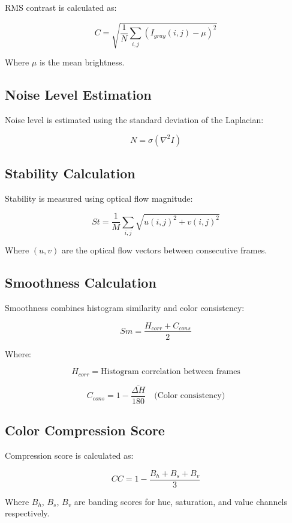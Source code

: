 \documentclass[
  11pt,
]{article}
\begin{document}
RMS contrast is calculated as:

\[C = \sqrt{\frac{1}{N} \sum_{i,j} (I_{gray}(i,j) - \mu)^2}\]

Where \(\mu\) is the mean brightness.

\hypertarget{noise-level-estimation}{%
\subsection{Noise Level Estimation}\label{noise-level-estimation}}

Noise level is estimated using the standard deviation of the Laplacian:

\[N = \sigma(\nabla^2 I)\]

\hypertarget{stability-calculation}{%
\subsection{Stability Calculation}\label{stability-calculation}}

Stability is measured using optical flow magnitude:

\[St = \frac{1}{M} \sum_{i,j} \sqrt{u(i,j)^2 + v(i,j)^2}\]

Where \((u, v)\) are the optical flow vectors between consecutive
frames.

\hypertarget{smoothness-calculation}{%
\subsection{Smoothness Calculation}\label{smoothness-calculation}}

Smoothness combines histogram similarity and color consistency:

\[Sm = \frac{H_{corr} + C_{cons}}{2}\]

Where:

\[H_{corr} = \text{Histogram correlation between frames}\]

\[C_{cons} = 1 - \frac{\bar{\Delta H}}{180} \quad \text{(Color consistency)}\]

\hypertarget{color-compression-score}{%
\subsection{Color Compression Score}\label{color-compression-score}}

Compression score is calculated as:

\[CC = 1 - \frac{B_h + B_s + B_v}{3}\]

Where \(B_h\), \(B_s\), \(B_v\) are banding scores for hue, saturation,
and value channels respectively.
\end{document}
